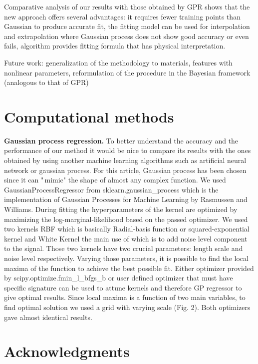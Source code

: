 \documentclass[aps,prl,reprint,amsmath,amssymb,nature]{revtex4-1}
\begin{document}
Comparative analysis of our results with those obtained by GPR shows 
that the new approach offers several advantages: it requires fewer 
training points than Gaussian to produce accurate fit, the fitting model 
can be used for interpolation and extrapolation where Gaussian process 
does not show good accuracy or even fails, algorithm provides fitting 
formula that has physical interpretation.

Future work: generalization of the methodology to materials, features 
with nonlinear parameters, reformulation of the procedure in the 
Bayesian framework (analogous to that of GPR)


\section{Computational methods}

\textbf{Gaussian process regression. }To better understand the 
accuracy and the performance of our method it would be nice to compare 
its results with the ones obtained by using another machine learning 
algorithms such as artificial neural network or gaussian process. For 
this article, Gaussian process has been chosen since it can "\,mimic" 
the shape of almost any complex function. We used 
GaussianProcessRegressor from sklearn.gaussian\_process which is the 
implementation of Gaussian Processes for Machine Learning by Rasmussen 
and Williams. During fitting the hyperparameters of the kernel are 
optimized by maximizing the log-marginal-likelihood based on the passed 
optimizer. We used two kernels RBF which is basically Radial-basis 
function or squared-exponential kernel and White Kernel the main use of 
which is to add noise level component to the signal. Those two kernels 
have two crucial parameters: length scale and noise level respectively. 
Varying those parameters, it is possible to find the local maxima of the 
function to achieve the best possible fit. Either optimizer provided by 
scipy.optimize.fmin\_l\_bfgs\_b or user defined optimizer that must have 
specific signature can be used to attune kernels and therefore GP 
regressor to give optimal results. Since local maxima is a function of 
two main variables, to find optimal solution we used a grid with varying 
scale (Fig. 2). Both optimizers gave almost identical results. 

\section{Acknowledgments} 
\end{document}
